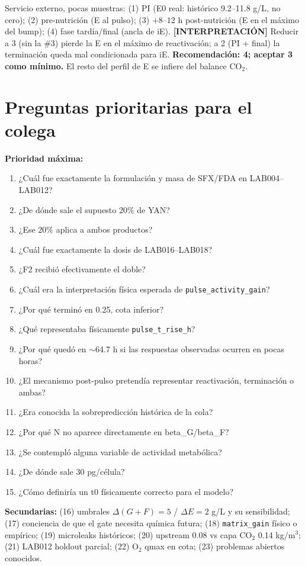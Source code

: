 \documentclass[11pt,a4paper]{article}
\newcommand{\code}[1]{\nolinkurl{#1}}
\newcommand{\interp}{\textcolor{interp}{\textbf{[INTERPRETACI\'ON]}}}
\begin{document}
Servicio externo, pocas muestras: (1) PI (E0 real: hist\'orico 9.2--11.8 g/L, no cero); (2) pre-nutrici\'on (E al pulso); (3) $+8$--$12$ h post-nutrici\'on (E en el m\'aximo del bump); (4) fase tard\'ia/final (ancla de iE). \interp{} Reducir a 3 (sin la \#3) pierde la E en el m\'aximo de reactivaci\'on; a 2 (PI + final) la terminaci\'on queda mal condicionada para iE. \textbf{Recomendaci\'on: 4; aceptar 3 como m\'inimo.} El resto del perfil de E se infiere del balance CO$_2$.

\section{Preguntas prioritarias para el colega}

\textbf{Prioridad m\'axima:}
\begin{enumerate}[leftmargin=*,itemsep=1pt]
\item ¿Cu\'al fue exactamente la formulaci\'on y masa de SFX/FDA en LAB004--LAB012?
\item ¿De d\'onde sale el supuesto 20\% de YAN?
\item ¿Ese 20\% aplica a ambos productos?
\item ¿Cu\'al fue exactamente la dosis de LAB016--LAB018?
\item ¿F2 recibi\'o efectivamente el doble?
\item ¿Cu\'al era la interpretaci\'on f\'isica esperada de \code{pulse_activity_gain}?
\item ¿Por qu\'e termin\'o en 0.25, cota inferior?
\item ¿Qu\'e representaba f\'isicamente \code{pulse_t_rise_h}?
\item ¿Por qu\'e qued\'o en ${\sim}$64.7 h si las respuestas observadas ocurren en pocas horas?
\item ¿El mecanismo post-pulso pretend\'ia representar reactivaci\'on, terminaci\'on o ambas?
\item ¿Era conocida la sobrepredicci\'on hist\'orica de la cola?
\item ¿Por qu\'e N no aparece directamente en beta\_G/beta\_F?
\item ¿Se contempl\'o alguna variable de actividad metab\'olica?
\item ¿De d\'onde sale 30 pg/c\'elula?
\item ¿C\'omo definir\'ia un t0 f\'isicamente correcto para el modelo?
\end{enumerate}

\textbf{Secundarias:} (16) umbrales $\Delta(G{+}F)=5$ / $\Delta E=2$ g/L y su sensibilidad; (17) conciencia de que el gate necesita qu\'imica futura; (18) \code{matrix_gain} f\'isico o emp\'irico; (19) microleaks hist\'oricos; (20) upstream 0.08 vs capa CO$_2$ 0.14 kg/m$^3$; (21) LAB012 holdout parcial; (22) O$_2$ qmax en cota; (23) problemas abiertos conocidos.
\end{document}
